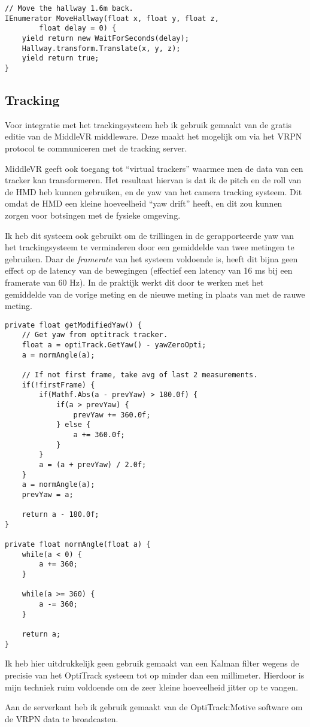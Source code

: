 \begin{verbatim}
// Move the hallway 1.6m back.
IEnumerator MoveHallway(float x, float y, float z, 
        float delay = 0) {
    yield return new WaitForSeconds(delay);
    Hallway.transform.Translate(x, y, z);
    yield return true;
}
\end{verbatim}

\subsection{Tracking}
Voor integratie met het trackingsysteem heb ik gebruik gemaakt van de gratis
editie van de MiddleVR middleware\cite{middlevr}. Deze maakt het mogelijk om via 
het VRPN protocol te communiceren met de tracking server.

MiddleVR geeft ook toegang tot ``virtual trackers'' waarmee men de data van een
tracker kan transformeren. Het resultaat hiervan is dat ik de pitch en de roll
van de HMD heb kunnen gebruiken, en de yaw van het camera tracking systeem. Dit
omdat de HMD een kleine hoeveelheid ``yaw drift'' heeft, en dit zou kunnen zorgen
voor botsingen met de fysieke omgeving.

Ik heb dit systeem ook gebruikt om de trillingen in de gerapporteerde yaw van het
trackingsysteem te verminderen door een gemiddelde van twee metingen te 
gebruiken. Daar de \emph{framerate} van het systeem voldoende is, heeft dit bijna 
geen effect op de latency van de bewegingen (effectief een latency van 16 ms bij
een framerate van 60 Hz). In de praktijk werkt dit door te werken met het 
gemiddelde van de vorige meting en de nieuwe meting in plaats van met de rauwe 
meting.

\begin{verbatim}
private float getModifiedYaw() {
    // Get yaw from optitrack tracker.
    float a = optiTrack.GetYaw() - yawZeroOpti;
    a = normAngle(a);

    // If not first frame, take avg of last 2 measurements.
    if(!firstFrame) {
        if(Mathf.Abs(a - prevYaw) > 180.0f) {
            if(a > prevYaw) {
                prevYaw += 360.0f;
            } else {
                a += 360.0f;
            }
        }
        a = (a + prevYaw) / 2.0f;
    }
    a = normAngle(a);
    prevYaw = a;

    return a - 180.0f;
}

private float normAngle(float a) {
    while(a < 0) {
        a += 360;
    }

    while(a >= 360) {
        a -= 360;
    }

    return a;
}
\end{verbatim}

Ik heb hier uitdrukkelijk geen gebruik gemaakt van een Kalman filter wegens de
precisie van het OptiTrack systeem tot op minder dan een millimeter. Hierdoor
is mijn techniek ruim voldoende om de zeer kleine hoeveelheid jitter op te
vangen.

Aan de serverkant heb ik gebruik gemaakt van de OptiTrack:Motive software om de
VRPN data te broadcasten.
